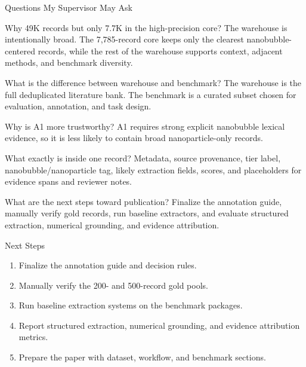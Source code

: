 \documentclass[aspectratio=169]{beamer}
\begin{document}
\begin{frame}{Questions My Supervisor May Ask}
\begin{block}{Why 49K records but only 7.7K in the high-precision core?}
The warehouse is intentionally broad. The 7,785-record core keeps only the clearest nanobubble-centered records, while the rest of the warehouse supports context, adjacent methods, and benchmark diversity.
\end{block}
\begin{block}{What is the difference between warehouse and benchmark?}
The warehouse is the full deduplicated literature bank. The benchmark is a curated subset chosen for evaluation, annotation, and task design.
\end{block}
\begin{block}{Why is A1 more trustworthy?}
A1 requires strong explicit nanobubble lexical evidence, so it is less likely to contain broad nanoparticle-only records.
\end{block}
\begin{block}{What exactly is inside one record?}
Metadata, source provenance, tier label, nanobubble/nanoparticle tag, likely extraction fields, scores, and placeholders for evidence spans and reviewer notes.
\end{block}
\begin{block}{What are the next steps toward publication?}
Finalize the annotation guide, manually verify gold records, run baseline extractors, and evaluate structured extraction, numerical grounding, and evidence attribution.
\end{block}
\end{frame}

\begin{frame}{Next Steps}
\begin{enumerate}
    \item Finalize the annotation guide and decision rules.
    \item Manually verify the 200- and 500-record gold pools.
    \item Run baseline extraction systems on the benchmark packages.
    \item Report structured extraction, numerical grounding, and evidence attribution metrics.
    \item Prepare the paper with dataset, workflow, and benchmark sections.
\end{enumerate}
\end{frame}
\end{document}
